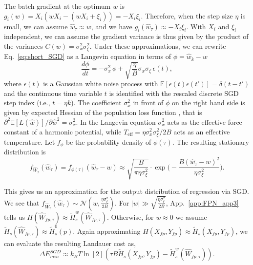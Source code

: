 \documentclass[12pt,onecolumn, margin=1in]{IEEEtran}
\newcommand{\paren}[1]{\left( #1 \right)}
\newcommand{\E}[1]{\mathbb{E}\left[ #1 \right]}
\newcommand{\gauss}[2]{\mathcal{N}\paren{#1, #2}}
\newcommand{\Wh}{\hat{W}}
\newcommand{\wh}{\hat{w}}
\newcommand{\sigx}{\sigma_x}
\newcommand{\sigxi}{\sigma_\xi}
\newcommand{\Ht}{\tilde{H}}
\newcommand{\Xfp}{X_{fp}}
\newcommand{\Yfp}{Y_{fp}}
\begin{document}
The batch gradient at the optimum $w$ is $g_i(w) = X_i(wX_i-(wX_i+\xi_i)) = -X_i\xi_i$. 
Therefore, when the step size $\eta$ is small, we can assume $\hat w_\tau \approx w$, and we have $g_i(\wh_\tau) \approx -X_i\xi_i$. With $X_i$ and $\xi_i$ independent, we can assume the gradient variance is thus given by the product of the variances $C(w) = \sigma_x^2\sigma_\xi^2$. Under these approximations, we can rewrite Eq.~\eqref{eq:short_SGD} as a Langevin equation in terms of $\phi=\wh_k - w$
\begin{equation}
    \frac{d\phi}{dt} = - \sigma_x^2 \, \phi + \sqrt{\frac{\eta}{B}} \sigma_x\sigma_\xi\, \epsilon(t),\label{eq:langevin}
\end{equation}
where $\epsilon(t)$ is a Gaussian white noise process with $\E{\epsilon(t)\epsilon(t')} = \delta(t-t')$ and the continuous time variable $t$ is identified with the rescaled discrete SGD step index (i.e., $t = \eta k$). The coefficient $\sigma_x^2$ in front of $\phi$ on the right hand side is given by expected Hessian of the population loss function \cite{MandtSGDBayes}, that is $\partial^2 \E{L(\wh)}/\partial \hat w^2 = \sigma^2_x$. 
In the Langevin equation $\sigx^2$ acts as the effective force constant of a harmonic potential, while $T_{\text{eff}} = \eta \sigma^2_x \sigma^2_\xi/2B$ acts as an effective temperature. Let $f_{\phi}$ be the probability density of $\phi(\tau)$. The resulting stationary distribution is
\begin{equation}
    \label{eq:SGD_final_dist}
    f_{\Wh_\tau}(\wh_\tau)=f_{\phi(\tau)}(\hat w_\tau-w) \approx \sqrt{\frac{B}{\pi \eta \sigma_\xi^2}} \cdot \exp\bigg(- \frac{B (\hat w_\tau - w)^2}{\eta \sigma_\xi^2}
    \bigg).
\end{equation}

This gives us an approximation for the output distribution of regression via SGD. We see that $f_{\Wh_\tau}(\wh_\tau) \sim \gauss{w}{\frac{\eta\sigxi^2}{2B}}$. For $|w| \gg \sqrt{\frac{\eta\sigxi^2}{2B}}$, App.~\ref{app:FPN_app3} tells us $H(\Wh_{fp,\tau}) \approx \Ht^{w}_s(\Wh_{fp,\tau})$. 
Otherwise, for $w \approx 0$ we assume $\tilde H_s(\Wh_{fp,\tau}) \approx \Ht^0_s(p)$.
Again approximating $H(X_{fp},Y_{fp}) \approx \tilde H_s(X_{fp}, Y_{fp})$, we can evaluate the resulting Landauer cost as, 
\begin{equation}
    \Delta E^{SGD}_{min} \approx k_BT \ln[2] \paren{\tau B \Ht_s(\Xfp,\Yfp) - \Ht_s^w(\Wh_{fp,\tau})}.
\end{equation} 
\end{document}
